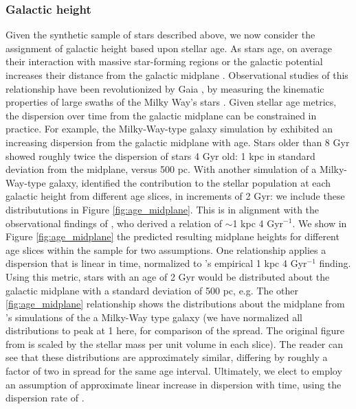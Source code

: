 \documentclass[twocolumn]{aastex631}
\begin{document}
\subsubsection{Galactic height}
\label{sec:galheight}
Given the synthetic sample of stars described above, we now consider the assignment of galactic height based upon stellar age. As stars age, on average their interaction with massive star-forming regions or the galactic potential increases their distance from the galactic midplane \citep{wielen_diffusion_1977, rocha-pinto_chemical_2004, almeida-fernandes_method_2018}. Observational studies of this relationship have been revolutionized by Gaia \citep{prusti_gaia_2016, vallenari_gaia_2023}, by measuring the kinematic properties of large swaths of the Milky Way's stars \citep{mackereth_dynamical_2019, vieira_vertical_2023}. Given stellar age metrics, the dispersion over time from the galactic midplane can be constrained in practice. For example, the Milky-Way-type galaxy simulation by \cite{carrillo_relationship_2023} exhibited an increasing dispersion from the galactic midplane with age. Stars older than 8 Gyr showed roughly twice the dispersion of stars 4 Gyr old: 1 kpc in standard deviation from the midplane, versus 500 pc. With another simulation of a Milky-Way-type galaxy, \cite{ma_structure_2017} identified the contribution to the stellar population at each galactic height from different age slices, in increments of 2 Gyr: we include these distribututions in Figure \ref{fig:age_midplane}. This is in alignment with the observational findings of \cite{casagrande_measuring_2016}, who derived a relation of $\sim$1 kpc 4 Gyr$^{-1}$. We show in Figure \ref{fig:age_midplane} the predicted resulting midplane heights for different age slices within the sample for two assumptions. One relationship applies a dispersion that is linear in time, normalized to \cite{casagrande_measuring_2016}'s empirical 1 kpc 4 Gyr$^{-1}$ finding. Using this metric, stars with an age of 2 Gyr would be distributed about the galactic midplane with a standard deviation of 500 pc, e.g. The other \ref{fig:age_midplane} relationship shows the distributions about the midplane from \citep{ma_structure_2017}'s simulations of the a Milky-Way type galaxy (we have normalized all distributions to peak at 1 here, for comparison of the spread. The original figure from \cite{ma_structure_2017} is scaled by the stellar mass per unit volume in each slice). The reader can see that these distributions are approximately similar, differing by roughly a factor of two in spread for the same age interval. Ultimately, we elect to employ an assumption of approximate linear increase in dispersion with time, using the dispersion rate of \cite{casagrande_measuring_2016}. 
\end{document}
